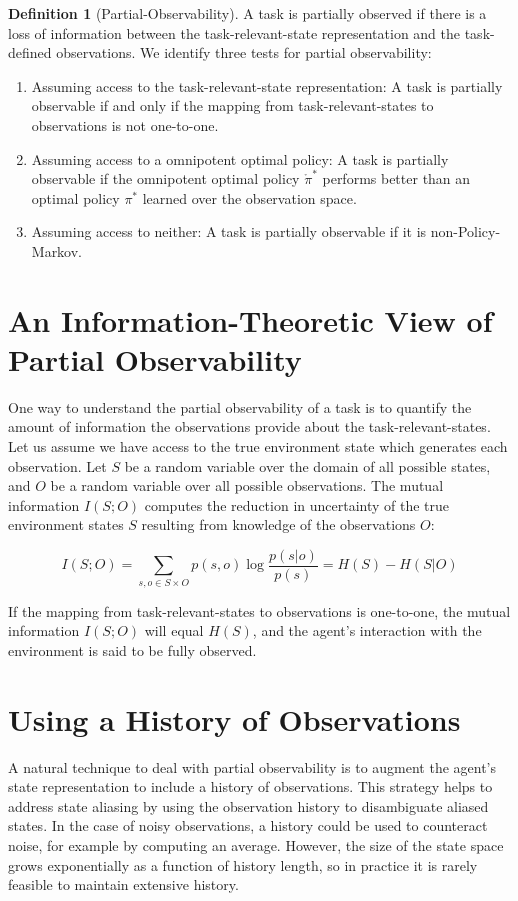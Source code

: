 \documentclass{article} %
\theoremstyle{definition}
\newtheorem{definition}{Definition}[section]
\begin{document}
\begin{definition}[Partial-Observability]
A task is partially observed if there is a loss of information between
the task-relevant-state representation and the task-defined
observations. We identify three tests for partial observability:
\begin{enumerate}
\item Assuming access to the task-relevant-state representation: A
  task is partially observable if and only if the mapping from
  task-relevant-states to observations is not one-to-one.
\item Assuming access to a omnipotent optimal policy: A task is
  partially observable if the omnipotent optimal policy
  $\mathring{\pi}^*$ performs better than an optimal policy $\pi^*$
  learned over the observation space.
\item Assuming access to neither: A task is partially observable if it
  is non-Policy-Markov.
\end{enumerate}
\end{definition}

\section{An Information-Theoretic View of Partial Observability}
One way to understand the partial observability of a task is to
quantify the amount of information the observations provide about the
task-relevant-states. Let us assume we have access to the true
environment state which generates each observation. Let $S$ be a
random variable over the domain of all possible states, and $O$ be a
random variable over all possible observations. The mutual information
$I(S;O)$ computes the reduction in uncertainty of the true environment
states $S$ resulting from knowledge of the observations $O$:

\[
I(S;O) = \sum_{s,o \in S \times O} p(s,o) \log \frac{p(s|o)}{p(s)} = H(S) - H(S|O)
\]

If the mapping from task-relevant-states to observations is
one-to-one, the mutual information $I(S;O)$ will equal $H(S)$, and the
agent's interaction with the environment is said to be fully observed.

\section{Using a History of Observations}
A natural technique to deal with partial observability is to augment
the agent's state representation to include a history of
observations. This strategy helps to address state aliasing by using
the observation history to disambiguate aliased states. In the case of
noisy observations, a history could be used to counteract noise, for
example by computing an average. However, the size of the state space
grows exponentially as a function of history length, so in practice it
is rarely feasible to maintain extensive history.
\end{document}
